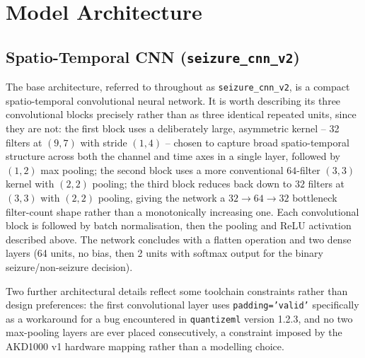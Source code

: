 \section{Model Architecture}


\subsection{Spatio-Temporal CNN (\texttt{seizure\_cnn\_v2})}


The base architecture, referred to throughout as \texttt{seizure\_cnn\_v2}, is a compact spatio-temporal convolutional neural network. It is worth describing its three convolutional blocks precisely rather than as three identical repeated units, since they are not: the first block uses a deliberately large, asymmetric kernel -- 32 filters at $(9,7)$ with stride $(1,4)$ -- chosen to capture broad spatio-temporal structure across both the channel and time axes in a single layer, followed by $(1,2)$ max pooling; the second block uses a more conventional $64$-filter $(3,3)$ kernel with $(2,2)$ pooling; the third block reduces back down to $32$ filters at $(3,3)$ with $(2,2)$ pooling, giving the network a $32\rightarrow64\rightarrow32$ bottleneck filter-count shape rather than a monotonically increasing one. Each convolutional block is followed by batch normalisation, then the pooling and ReLU activation described above. The network concludes with a flatten operation and two dense layers (64 units, no bias, then 2 units with softmax output for the binary seizure/non-seizure decision).

Two further architectural details reflect some toolchain constraints rather than design preferences: the first convolutional layer uses \texttt{padding='valid'} specifically as a workaround for a bug encountered in \texttt{quantizeml} version 1.2.3, and no two max-pooling layers are ever placed consecutively, a constraint imposed by the AKD1000 v1 hardware mapping rather than a modelling choice.

